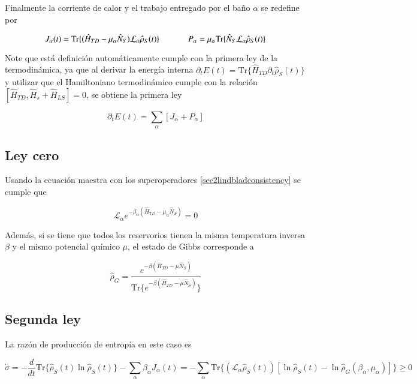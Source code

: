 Finalmente la corriente de calor y el trabajo entregado por el baño $\alpha$ se redefine por

\begin{equation*}
    J_{\alpha}(t) = \text{Tr}\{(\hat{H}_{TD} - \mu_{\alpha}\hat{N}_S)\mathcal{L}_{\alpha}\hat{\rho}_{S}(t) \} \hspace{12mm} P_{\alpha} = \mu_{\alpha} \text{Tr}\{\hat{N}_{S}\mathcal{L}_{\alpha}\hat{\rho}_{S}(t) \} 
\end{equation*}

Note que está definición automáticamente cumple con la primera ley de la termodinámica, ya que al derivar la energía interna $\partial_{t}E(t) = \text{Tr}\{ \hat{H}_{TD}\partial_{t}\hat{\rho}_{S}(t) \}$ y utilizar que el Hamiltoniano termodinámico cumple con la relación $[\hat{H}_{TD},\hat{H}_{s} + \hat{H}_{LS}] = 0$, se obtiene la primera ley

\begin{equation*}
    \partial_{t}E(t) = \sum_{\alpha}[J_{\alpha} + P_{\alpha}]
\end{equation*}

\subsection{Ley cero}
Usando la ecuación maestra con los superoperadores \ref{sec2lindbladconsistency} se cumple que

\begin{equation}
    \mathcal{L}_{\alpha}e^{-\beta_{\alpha}(\hat{H}_{TD} - \mu_{\alpha}\hat{N}_{S})} = 0
\label{sec2cerolaw}
\end{equation}

Además, si se tiene que todos los reservorios tienen la misma temperatura inversa $\beta$ y el mismo potencial químico $\mu$, el estado de Gibbs corresponde a 

\begin{equation*}
    \hat{\rho}_G = \frac{e^{-\beta(\hat{H}_{TD} - \mu \hat{N}_{S})}}{\text{Tr}\{ e^{-\beta(\hat{H}_{TD} - \mu \hat{N}_{S})}\}}
\end{equation*}

\subsection{Segunda ley}
La razón de producción de entropía en este caso es 

\begin{equation}
    \dot{\sigma} = - \frac{d}{dt}\text{Tr}\{\hat{\rho}_{S}(t) \ln \hat{\rho}_{S}(t) \} - \sum_{\alpha} \beta_{\alpha} J_{\alpha}(t) = -\sum_{\alpha} \text{Tr}\{(\mathcal{L}_{\alpha}\hat{\rho}_{S}(t))[\ln \hat{\rho}_{S}(t) - \ln \hat{\rho}_{G}(\beta_{\alpha},\mu_{\alpha})] \} \geq 0
\label{sec2secondlaw}
\end{equation}

